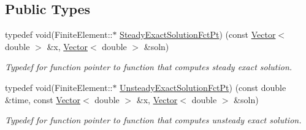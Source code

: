 \subsection*{Public Types}
\begin{DoxyCompactItemize}
\item 
typedef void(Finite\+Element\+::$\ast$ \hyperlink{classoomph_1_1Mesh_a059e155da2b47cc94c3306398bd2be07}{Steady\+Exact\+Solution\+Fct\+Pt}) (const \hyperlink{classoomph_1_1Vector}{Vector}$<$ double $>$ \&x, \hyperlink{classoomph_1_1Vector}{Vector}$<$ double $>$ \&soln)
\begin{DoxyCompactList}\small\item\em Typedef for function pointer to function that computes steady exact solution. \end{DoxyCompactList}\item 
typedef void(Finite\+Element\+::$\ast$ \hyperlink{classoomph_1_1Mesh_a4fccd0b52d2384b0d4f423118284882d}{Unsteady\+Exact\+Solution\+Fct\+Pt}) (const double \&time, const \hyperlink{classoomph_1_1Vector}{Vector}$<$ double $>$ \&x, \hyperlink{classoomph_1_1Vector}{Vector}$<$ double $>$ \&soln)
\begin{DoxyCompactList}\small\item\em Typedef for function pointer to function that computes unsteady exact solution. \end{DoxyCompactList}\end{DoxyCompactItemize}
